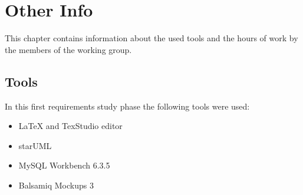 \documentclass[\mainpath/main]{subfiles}
\begin{document}
\chapter{Other Info}
\label{other_info}

\setmyfancystyle

This chapter contains information about the used tools and the hours of work by the members of the working group.

\section{Tools}
In this first requirements study phase the following tools were used:
\begin{itemize}
	\item \LaTeX{} and TexStudio editor
	\item starUML
	\item MySQL Workbench 6.3.5
	\item Balsamiq Mockups 3
\end{itemize}

\clearpage
\end{document}
